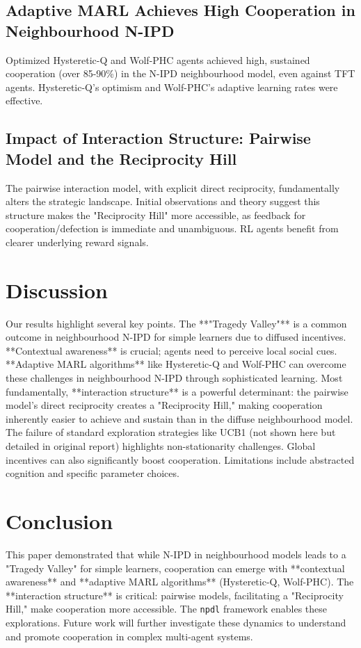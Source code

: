 \documentclass[]{llncs} %
\begin{document}
\subsection{Adaptive MARL Achieves High Cooperation in Neighbourhood N-IPD}
Optimized Hysteretic-Q and Wolf-PHC agents achieved high, sustained cooperation (over 85-90\%) in the N-IPD neighbourhood model, even against TFT agents. Hysteretic-Q's optimism and Wolf-PHC's adaptive learning rates were effective.

\subsection{Impact of Interaction Structure: Pairwise Model and the Reciprocity Hill}
The pairwise interaction model, with explicit direct reciprocity, fundamentally alters the strategic landscape. Initial observations and theory suggest this structure makes the "Reciprocity Hill" more accessible, as feedback for cooperation/defection is immediate and unambiguous. RL agents benefit from clearer underlying reward signals.

\section{Discussion}
\label{sec:discussion}
Our results highlight several key points. The **"Tragedy Valley"** is a common outcome in neighbourhood N-IPD for simple learners due to diffused incentives. **Contextual awareness** is crucial; agents need to perceive local social cues. **Adaptive MARL algorithms** like Hysteretic-Q and Wolf-PHC can overcome these challenges in neighbourhood N-IPD through sophisticated learning. Most fundamentally, **interaction structure** is a powerful determinant: the pairwise model's direct reciprocity creates a "Reciprocity Hill," making cooperation inherently easier to achieve and sustain than in the diffuse neighbourhood model.
The failure of standard exploration strategies like UCB1 (not shown here but detailed in original report) highlights non-stationarity challenges. Global incentives can also significantly boost cooperation.
Limitations include abstracted cognition and specific parameter choices.

\section{Conclusion}
\label{sec:conclusion}
This paper demonstrated that while N-IPD in neighbourhood models leads to a "Tragedy Valley" for simple learners, cooperation can emerge with **contextual awareness** and **adaptive MARL algorithms** (Hysteretic-Q, Wolf-PHC). The **interaction structure** is critical: pairwise models, facilitating a "Reciprocity Hill," make cooperation more accessible. The \texttt{npdl} framework enables these explorations. Future work will further investigate these dynamics to understand and promote cooperation in complex multi-agent systems.


\end{document}
